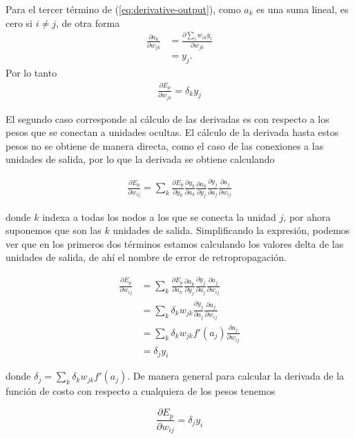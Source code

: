 Para el tercer término de (\ref{eq:derivative-output}), 
como $a_k$ es una suma lineal, es cero si $i \neq j$, de otra forma
\begin{align*}
    \frac{\partial a_k}{\partial w_{jk}} &=  \frac{\partial \sum_i w_{ik}y_i}{\partial w_{jk}}\\
    &= y_j.
\end{align*}
Por lo tanto
\begin{align*}
    \frac{\partial E_p}{\partial w_{jk}} = \delta_k y_j 
\end{align*}

El segundo caso corresponde al cálculo de las derivadas es con respecto a los
pesos que se conectan a unidades ocultas. El cálculo de la derivada hasta estos pesos
no se obtiene de manera directa, como el caso de las conexiones a las unidades de salida,
por lo que la derivada se obtiene calculando

\begin{align*}
    \frac{\partial E_p}{ \partial w_{ij}} = \sum_k \frac{\partial E_p}{\partial y_k} \frac{\partial y_k}{\partial a_k} \frac{\partial a_k}{\partial y_j} \frac{\partial y_j}{\partial a_j} \frac{\partial a_j}{\partial w_{ij}}
\end{align*}

donde $k$ indexa a todas los nodos a los que se conecta la unidad $j$, por ahora suponemos 
que son las $k$ unidades de salida. Simplificando la expresión, podemos ver que
en los primeros dos términos estamos calculando los valores delta de las unidades de 
salida, de ahí el nombre de error de retropropagación.

\begin{align*}
    \frac{\partial E_p}{ \partial w_{ij}} &= \sum_k \frac{\partial E_p}{\partial a_k} \frac{\partial a_k}{\partial y_j} \frac{\partial y_j}{\partial a_j} \frac{\partial a_j}{\partial w_{ij}}\\
    &= \sum_k \delta_k w_{jk} \frac{\partial y_j}{\partial a_j} \frac{\partial a_j}{\partial w_{ij}} \\
    &= \sum_k \delta_k w_{jk} f'(a_j) \frac{\partial a_j}{\partial w_{ij}} \\
    &= \delta_j y_i
\end{align*}

donde $\delta_j = \sum_k \delta_k w_{jk} f'(a_j)$. De manera general
para calcular la derivada de la función de costo con respecto a cualquiera de
los pesos tenemos

\[
\frac{\partial E_p}{\partial w_{ij}} = \delta_j y_i
\]

